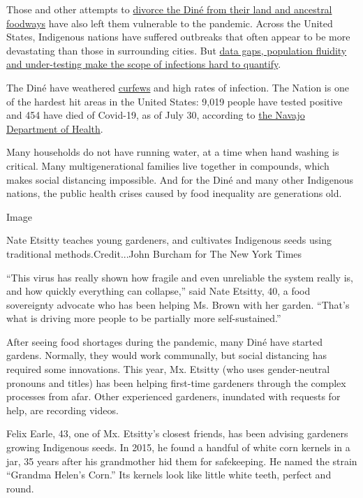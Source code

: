 Those and other attempts to
\href{https://www.firstnations.org/wp-content/uploads/publication-attachments/Dine_Policy_Institute_Food_Sovereignty_Report.pdf}{divorce
the Diné from their land and ancestral foodways} have also left them
vulnerable to the pandemic. Across the United States, Indigenous nations
have suffered outbreaks that often appear to be more devastating than
those in surrounding cities. But
\href{https://www.nytimes3xbfgragh.onion/2020/07/30/us/native-americans-coronavirus-data.html}{data
gaps, population fluidity and under-testing make the scope of infections
hard to quantify}.

The Diné have weathered
\href{https://www.reuters.com/article/us-health-coronavirus-usa-navajo/facing-arizona-surge-navajos-reimpose-virus-curfew-idUSKBN23O3R4}{curfews}
and high rates of infection. The Nation is one of the hardest hit areas
in the United States: 9,019 people have tested positive and 454 have
died of Covid-19, as of July 30, according to
\href{https://www.ndoh.navajo-nsn.gov/COVID-19}{the Navajo Department of
Health}.

Many households do not have running water, at a time when hand washing
is critical. Many multigenerational families live together in compounds,
which makes social distancing impossible. And for the Diné and many
other Indigenous nations, the public health crises caused by food
inequality are generations old.

Image

Nate Etsitty teaches young gardeners, and cultivates Indigenous seeds
using traditional methods.Credit...John Burcham for The New York Times

``This virus has really shown how fragile and even unreliable the system
really is, and how quickly everything can collapse,'' said Nate Etsitty,
40, a food sovereignty advocate who has been helping Ms. Brown with her
garden. ``That's what is driving more people to be partially more
self-sustained.''

After seeing food shortages during the pandemic, many Diné have started
gardens. Normally, they would work communally, but social distancing has
required some innovations. This year, Mx. Etsitty (who uses
gender-neutral pronouns and titles) has been helping first-time
gardeners through the complex processes from afar. Other experienced
gardeners, inundated with requests for help, are recording videos.

Felix Earle, 43, one of Mx. Etsitty's closest friends, has been advising
gardeners growing Indigenous seeds. In 2015, he found a handful of white
corn kernels in a jar, 35 years after his grandmother hid them for
safekeeping. He named the strain ``Grandma Helen's Corn.'' Its kernels
look like little white teeth, perfect and round.

